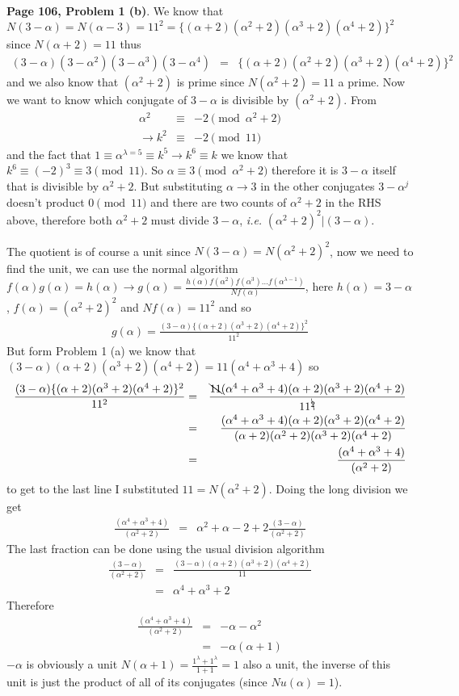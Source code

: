 \documentclass[aps,preprint,preprintnumbers,nofootinbib,showpacs,prd]{revtex4-1}
\newcommand{\ie}{{\it i.e.} }
\newcommand{\nbea}{\begin{eqnarray*}}
\newcommand{\neea}{\end{eqnarray*}}
\begin{document}
{\bf Page 106, Problem 1 (b)}. We know that $N(3 - \alpha) = N(\alpha - 3) = 11^2 = \{(\alpha + 2)(\alpha^2 + 2)(\alpha^3 + 2)(\alpha^4 + 2)\}^2$ since $N(\alpha + 2) = 11$ thus
%
\nbea
(3 - \alpha)(3 - \alpha^2)(3 - \alpha^3)(3 - \alpha^4) & = & \{(\alpha + 2)(\alpha^2 + 2)(\alpha^3 + 2)(\alpha^4 + 2)\}^2
\neea
%
and we also know that $(\alpha^2 + 2)$ is prime since $N(\alpha^2 + 2) = 11$ a prime. Now we want to know which conjugate of $3 - \alpha$ is divisible by $(\alpha^2 + 2)$. From
%
\nbea
\alpha^2 & \equiv & -2 \pmod{\alpha^2 + 2} \\
\to k^2 & \equiv & -2 \pmod{11}
\neea
%
and the fact that $1 \equiv \alpha^{\lambda = 5} \equiv k^5 \to k^6 \equiv k$ we know that $k^6 \equiv (-2)^3 \equiv 3 \pmod{11}$. So $\alpha \equiv 3 \pmod{\alpha^2 + 2}$ therefore it is $3 - \alpha$ itself that is divisible by $\alpha^2 + 2$. But substituting $\alpha \to 3$ in the other conjugates $3 - \alpha^j$ doesn't product $0 \pmod{11}$ and there are two counts of $\alpha^2 + 2$ in the RHS above, therefore both $\alpha^2 + 2$ must divide $3 - \alpha$, \ie $(\alpha^2 + 2)^2 | (3 - \alpha)$.

The quotient is of course a unit since $N(3 - \alpha) = N(\alpha^2 + 2)^2$, now we need to find the unit, we can use the normal algorithm $f(\alpha)g(\alpha) = h(\alpha) \to g(\alpha) = \frac{h(\alpha)f(\alpha^2)f(\alpha^3)\dots f(\alpha^{\lambda-1})}{Nf(\alpha)}$, here $h(\alpha) = 3 - \alpha$, $f(\alpha) = (\alpha^2 + 2)^2$ and $Nf(\alpha) = 11^2$ and so
%
\nbea
g(\alpha) = \frac{(3-\alpha)\{(\alpha + 2)(\alpha^3 + 2)(\alpha^4 + 2)\}^2}{11^2}
\neea
%
But form Problem 1 (a) we know that $(3-\alpha)(\alpha + 2)(\alpha^3 + 2)(\alpha^4 + 2) = 11(\alpha^4 + \alpha^3 + 4)$ so
%
\nbea
\frac{(3-\alpha)\{(\alpha + 2)(\alpha^3 + 2)(\alpha^4 + 2)\}^2}{11^2} & = & \frac{\bcancel{11}(\alpha^4 + \alpha^3 + 4)(\alpha + 2)(\alpha^3 + 2)(\alpha^4 + 2)}{11^{\bcancel{2}}} \\
& = & \frac{(\alpha^4 + \alpha^3 + 4)(\alpha + 2)(\alpha^3 + 2)(\alpha^4 + 2)}{(\alpha + 2)(\alpha^2 + 2)(\alpha^3 + 2)(\alpha^4 + 2)} \\
& = & \frac{(\alpha^4 + \alpha^3 + 4)}{(\alpha^2 + 2)}
\neea
%
to get to the last line I substituted $11 = N(\alpha^2 + 2)$. Doing the long division we get
%
\nbea
\frac{(\alpha^4 + \alpha^3 + 4)}{(\alpha^2 + 2)} & = & \alpha^2 + \alpha - 2 + 2\frac{(3 - \alpha)}{(\alpha^2 + 2)}
\neea
%
The last fraction can be done using the usual division algorithm
%
\nbea
\frac{(3 - \alpha)}{(\alpha^2 + 2)} & = & \frac{(3 - \alpha)(\alpha + 2)(\alpha^3 + 2)(\alpha^4 + 2)}{11} \\
& = & \alpha^4 + \alpha^3 + 2
\neea
%
Therefore
%
\nbea
\frac{(\alpha^4 + \alpha^3 + 4)}{(\alpha^2 + 2)} & = & -\alpha - \alpha^2 \\
& = & -\alpha(\alpha + 1)
\neea
%
$-\alpha$ is obviously a unit $N(\alpha + 1) = \frac{1^\lambda + 1^\lambda}{1 + 1} = 1$ also a unit, the inverse of this unit is just the product of all of its conjugates (since $Nu(\alpha) = 1$).
\end{document}
